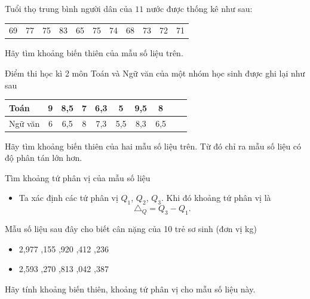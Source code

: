 \begin{vd}
	Tuổi thọ trung bình người dân của $ 11 $ nước được thống kê như sau:
	\begin{longtable}{p{}p{0.7cm}p{0.7cm}p{0.7cm}p{0.7cm}p{0.7cm}p{0.7cm}p{0.7cm}p{0.7cm}p{0.7cm}p{0.7cm}}
		69 & 77 & 75 & 83 & 65 & 75 & 74 & 68 & 73 & 72 & 71
	\end{longtable}
	Hãy tìm khoảng biến thiên của mẫu số liệu trên.
\end{vd}

\begin{vd}
	Điểm thi học kì 2 môn Toán và Ngữ văn của một nhóm học sinh được ghi lại như sau
	\begin{longtable}{|l|c|c|c|c|c|c|c|c|c|}
		\hline 
		Toán & 9 & 8{,}5 & 7 & 6{,}3 & 5 & 9{,}5 & 8 \\ 
		\hline 
		Ngữ văn & 6 & 6{,}5 & 8 & 7{,}3 & 5{,}5 & 8{,}3 & 6{,}5 \\ 
		\hline 
	\end{longtable}
	Hãy tìm khoảng biến thiên của hai mẫu số liệu trên. Từ đó chỉ ra mẫu số liệu có độ phân tán lớn hơn.
\end{vd}
\begin{dang}{Tìm khoảng tứ phân vị của mẫu số liệu}
	\begin{itemize}
		\item [\iconMT]   Ta xác định các tứ phân vị $Q_1$, $Q_2$, $Q_3$. Khi đó khoảng tứ phân vị là $$\triangle_Q=Q_3-Q_1.$$
	\end{itemize}
\end{dang}
\begin{vd}
	Mẫu số liệu sau đây cho biết cân nặng của 10 trẻ sơ sinh (đơn vị kg)
	\begin{itemize}
		\item [] 2,977 ,155 ,920 ,412 ,236
		\item [] 2,593 ,270 ,813 ,042 ,387
	\end{itemize}
	Hãy tính khoảng biến thiên, khoảng tứ phân vị cho mẫu số liệu này.
\end{vd}

